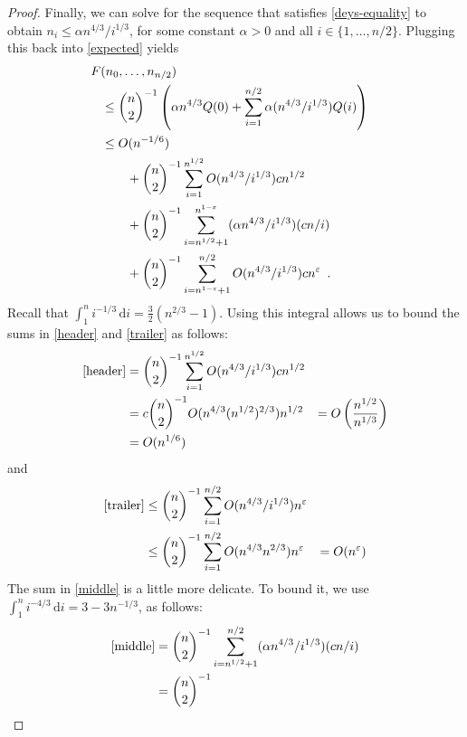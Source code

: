 \documentclass{cccg12}
\newcommand{\eps}{\varepsilon}
\begin{document}
\begin{proof}
  Finally, we can solve for the sequence that satisfies
  \eqref{deys-equality} to obtain $n_i \le \alpha n^{4/3}/i^{1/3}$, for
  some constant $\alpha>0$ and all $i\in\{1,\ldots,n/2\}$.  Plugging this
  back into \eqref{expected} yields
  \begin{align}
     & \!\!\!\!\! F(n_0,\ldots,n_{n/2}) \notag \\
      & \le \binom{n}{2}^{-1}\left(\alpha n^{4/3} Q(0)+\sum_{i=1}^{n/2} \alpha (n^{4/3}/i^{1/3})Q(i)\right) \notag \\
      & \le O(n^{-1/6}) \notag \\
      & \qquad {} + \binom{n}{2}^{-1}\sum_{i=1}^{n^{1/2}} O(n^{4/3}/i^{1/3})cn^{1/2}  \eqlabel{header}\\
      & \qquad {} + \binom{n}{2}^{-1}\sum_{i=n^{1/2}+1}^{n^{1-\eps}} (\alpha n^{4/3}/i^{1/3})(cn/i)  \eqlabel{middle} \\
      & \qquad {} + \binom{n}{2}^{-1}\sum_{i=n^{1-\eps}+1}^{n/2} O(n^{4/3}/i^{1/3})cn^{\eps} \eqlabel{trailer} \enspace .
  \end{align}
  Recall that $\int_1^n i^{-1/3}\,\mathrm{d}i = \frac{3}{2}(n^{2/3}-1)$.
  Using this integral allows us to bound the sums in \eqref{header}
  and \eqref{trailer} as follows:
  \begin{align*}
    \eqref{header} & = \binom{n}{2}^{-1}\sum_{i=1}^{n^{1/2}} O(n^{4/3}/i^{1/3})cn^{1/2} \\
        & = c\binom{n}{2}^{-1}O(n^{4/3}(n^{1/2})^{2/3})n^{1/2}
        & = O\left(\frac{n^{1/2}}{n^{1/3}}\right) \\
        & = O(n^{1/6})
  \end{align*}
  and 
  \begin{align*}
    \eqref{trailer} 
      & \le \binom{n}{2}^{-1}\sum_{i=1}^{n/2} O(n^{4/3}/i^{1/3})n^{\eps} \\
      & \le \binom{n}{2}^{-1}\sum_{i=1}^{n/2} O(n^{4/3}n^{2/3})n^{\eps} 
        & = O(n^{\eps})
  \end{align*}
  The sum in \eqref{middle} is a little more delicate.  To bound it, we
  use $\int_1^n i^{-4/3}\,\mathrm{d}i = 3-3n^{-1/3}$, as follows:
  \begin{align*}
    \eqref{middle} 
      & = \binom{n}{2}^{-1}
       \sum_{i=n^{1/2}+1}^{n/2} (\alpha n^{4/3}/i^{1/3})(cn/i) \\
      & = \binom{n}{2}^{-1}

\end{align*}
\end{proof}
\end{document}
